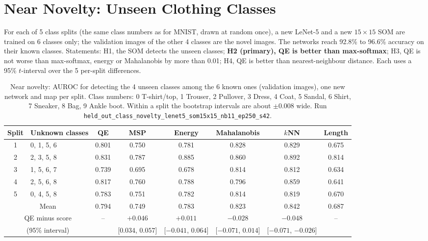 \documentclass[11pt]{article}
\begin{document}
\section{Near Novelty: Unseen Clothing Classes}\label{sec:heldout}

For each of 5 class splits (the same class numbers as for MNIST, drawn at random once), a new LeNet-5 and a new $15\times15$ SOM are trained on 6 classes only; the validation images of the other 4 classes are the novel images. The networks reach 92.8\% to 96.6\% accuracy on their known classes. Statements: H1, the SOM detects the unseen classes; \textbf{H2 (primary), QE is better than max-softmax}; H3, QE is not worse than max-softmax, energy or Mahalanobis by more than 0.01; H4, QE is better than nearest-neighbour distance. Each uses a 95\% $t$-interval over the 5 per-split differences.

\begin{table}[H]
\centering\footnotesize\setlength{\tabcolsep}{3pt}
\begin{tabular}{@{}clcccccc@{}}\toprule
Split & Unknown classes & QE & MSP & Energy & Mahalanobis & $k$NN & Length\\\midrule
1 & 0, 1, 5, 6 & 0.801 & 0.750 & 0.781 & 0.828 & 0.829 & 0.675\\
2 & 2, 3, 5, 8 & 0.831 & 0.787 & 0.885 & 0.860 & 0.892 & 0.814\\
3 & 1, 5, 6, 7 & 0.739 & 0.695 & 0.678 & 0.814 & 0.812 & 0.634\\
4 & 2, 5, 6, 8 & 0.817 & 0.760 & 0.788 & 0.796 & 0.859 & 0.641\\
5 & 0, 4, 5, 8 & 0.783 & 0.751 & 0.782 & 0.814 & 0.819 & 0.670\\\midrule
\multicolumn{2}{c}{Mean} & 0.794 & 0.749 & 0.783 & 0.823 & 0.842 & 0.687\\
\multicolumn{2}{c}{QE minus score} & -- & $+0.046$ & $+0.011$ & $-0.028$ & $-0.048$ & --\\
\multicolumn{2}{c}{(95\% interval)} & & [$0.034$, $0.057$] & [$-0.041$, $0.064$] & [$-0.071$, $0.014$] & [$-0.071$, $-0.026$] & \\\bottomrule
\end{tabular}
\caption{Near novelty: AUROC for detecting the 4 unseen classes among the 6 known ones (validation images), one new network and map per split. Class numbers: 0 T-shirt/top, 1 Trouser, 2 Pullover, 3 Dress, 4 Coat, 5 Sandal, 6 Shirt, 7 Sneaker, 8 Bag, 9 Ankle boot. Within a split the bootstrap intervals are about $\pm0.008$ wide. Run \texttt{held\_out\_class\_novelty\_lenet5\_som15x15\_nb11\_ep250\_s42}.}
\label{tab:heldout}
\end{table}
\end{document}
